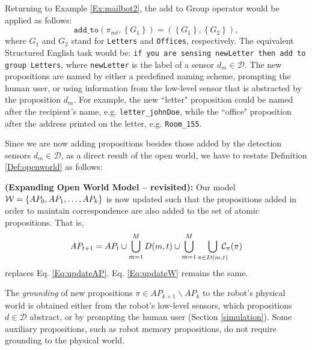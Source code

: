 
Returning to Example \ref{Ex:mailbot2}, the add to Group operator would be applied as follows: 
$$ \texttt{add\_to}(\pi_{mt}, \left\{ G_1 \right\}) = ( \left\{ G_1 \right\},  \left\{ G_2 \right\}),$$
where $G_1$ and $G_2$ stand for \texttt{Letters} and \texttt{Offices}, respectively.
The equivalent Structured English task would be: \texttt{if you are sensing newLetter then add to group Letters}, where \texttt{newLetter} is the label of a sensor $d_m \in \mathcal{D}$. The new propositions are named by either a predefined naming scheme, prompting the human user, or using information from the low-level sensor that is abstracted by the proposition $d_m$. For example, the new ``letter" proposition could be named after the recipient's name, e.g. \texttt{letter\_johnDoe}, while the ``office" proposition after the address printed on the letter, e.g. \texttt{Room\_155}.

Since we are now adding propositions besides those added by the detection sensors $d_m \in \mathcal{D}$, as a direct result of the open world, we have to restate Definition \ref{Def:openworld} as follows:

\begin{myDefinition}\label{Def:openworld2}
	\textbf{(Expanding Open World Model -- revisited):} Our model $\mathcal{W} = \left\{ AP_0, AP_1, \ldots, AP_k \right\}$ is now updated such that the propositions added in order to maintain correspondence are also added to the set of atomic propositions. That is, 
	\begin{equation}\label{Eq:updateAP2}
		 AP_{t+1} = AP_t \cup \bigcup_{m=1}^{M}D(m, t) \cup \bigcup_{m=1}^{M} \smashoperator[r]{\bigcup_{\pi \in D(m, t)}}~ \mathcal{C}_{\pi}(\pi)
	\end{equation}
	replaces Eq. \eqref{Eq:updateAP}. Eq. \eqref{Eq:updateW} remains the same.
\end{myDefinition}

\begin{myAssumption}\label{Ass:grounding}
	The \emph{grounding} \cite{Grounding2013} of new propositions $\pi \in AP_{k+1} \backslash AP_k$ to the robot's physical world is obtained either from the robot's low-level sensors, which propositions $d \in \mathcal{D}$ abstract, or by prompting the human user (Section \ref{simulation}).
Some auxiliary propositions, such as robot memory propositions, do not require grounding to the physical world.
\end{myAssumption}

